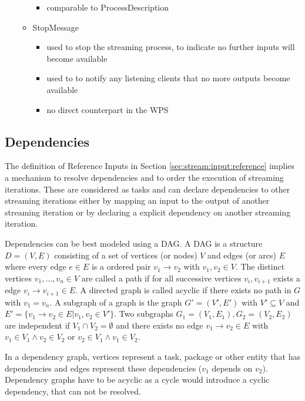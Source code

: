 \begin{itemize}
\begin{itemize}
\begin{itemize}
					\item comparable to ProcessDescription
				\end{itemize}
				\item StopMessage
				\begin{itemize}
					\item used to stop the streaming process, to indicate no further inputs will become available
					\item used to to notify any listening clients that no more outputs become available
					\item no direct counterpart in the WPS
				\end{itemize}
			\end{itemize}
		\end{itemize}
	\subsection{Dependencies}\label{sec:stream:dependencies}
		The definition of Reference Inputs in Section \ref{sec:stream:input:reference} implies a mechanism to resolve dependencies and to order the execution of streaming iterations. These are considered as tasks and can declare dependencies to other streaming iterations either by mapping an input to the output of another streaming iteration or by declaring a explicit dependency on another streaming iteration.

		Dependencies can be best modeled using a \ac{DAG}. A \ac{DAG} is a structure $D=(V, E)$ consisting of a set of vertices (or nodes) $V$ and edges (or arcs) $E$ where every edge $e\in E$ is a ordered pair $v_1 \rightarrow v_2$ with $v_1, v_2 \in V$. The distinct vertices $v_1,\dots,v_n\in V$ are called a path if for all successive vertices $v_i, v_{i+1}$ exists a edge $v_i \rightarrow v_{i+1} \in E$. A directed graph is called acyclic if there exists no path in $G$ with $v_1 = v_n$. A subgraph of a graph is the graph $G' = (V', E')$ with $V'\subseteq V$ and $E' = \{v_1 \rightarrow v_2 \in E | v_1, v_2\in V'\}$. Two subgraphs $G_1 = (V_1, E_1), G_2 = (V_2, E_2)$ are independent if $V_1 \cap V_2 = \emptyset$ and there exists no edge $v_1\rightarrow v_2\in E$ with $v_1\in V_1 \wedge v_2\in V_2$ or $v_2\in V_1 \wedge v_1\in V_2$.


		In a dependency graph, vertices represent a task, package or other entity that has dependencies and edges represent these dependencies ($v_1$ depends on $v_2$). Dependency graphs have to be acyclic as a cycle would introduce a cyclic dependency, that can not be resolved.

